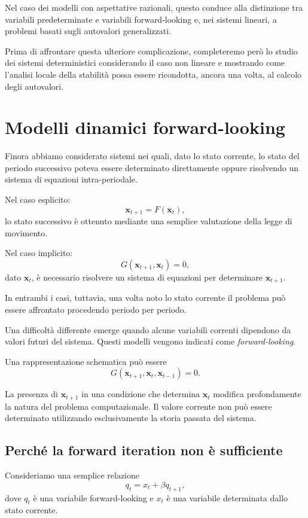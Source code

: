 \documentclass{book}
\begin{document}
Nel caso dei modelli con aspettative razionali, questo conduce alla
distinzione tra variabili predeterminate e variabili forward-looking e,
nei sistemi lineari, a problemi basati sugli autovalori generalizzati.

Prima di affrontare questa ulteriore complicazione, completeremo però lo
studio dei sistemi deterministici considerando il caso non lineare e
mostrando come l'analisi locale della stabilità possa essere ricondotta,
ancora una volta, al calcolo degli autovalori.

\section{Modelli dinamici forward-looking}

Finora abbiamo considerato sistemi nei quali, dato lo stato corrente,
lo stato del periodo successivo poteva essere determinato direttamente
oppure risolvendo un sistema di equazioni intra-periodale.

Nel caso esplicito:
\[
\mathbf{x}_{t+1}=F(\mathbf{x}_t),
\]
lo stato successivo è ottenuto mediante una semplice valutazione della
legge di movimento.

Nel caso implicito:
\[
G(\mathbf{x}_{t+1},\mathbf{x}_t)=0,
\]
dato $\mathbf{x}_t$, è necessario risolvere un sistema di equazioni per
determinare $\mathbf{x}_{t+1}$.

In entrambi i casi, tuttavia, una volta noto lo stato corrente il
problema può essere affrontato procedendo periodo per periodo.

Una difficoltà differente emerge quando alcune variabili correnti
dipendono da valori futuri del sistema. Questi modelli vengono indicati
come \emph{forward-looking}.

Una rappresentazione schematica può essere
\[
G(\mathbf{x}_{t+1},\mathbf{x}_t,\mathbf{x}_{t-1})=0.
\]

La presenza di $\mathbf{x}_{t+1}$ in una condizione che determina
$\mathbf{x}_t$ modifica profondamente la natura del problema
computazionale. Il valore corrente non può essere determinato
utilizzando esclusivamente la storia passata del sistema.


\subsection{Perché la forward iteration non è sufficiente}

Consideriamo una semplice relazione
\[
q_t
=
x_t+\beta q_{t+1},
\]
dove $q_t$ è una variabile forward-looking e $x_t$ è una variabile
determinata dallo stato corrente.
\end{document}
